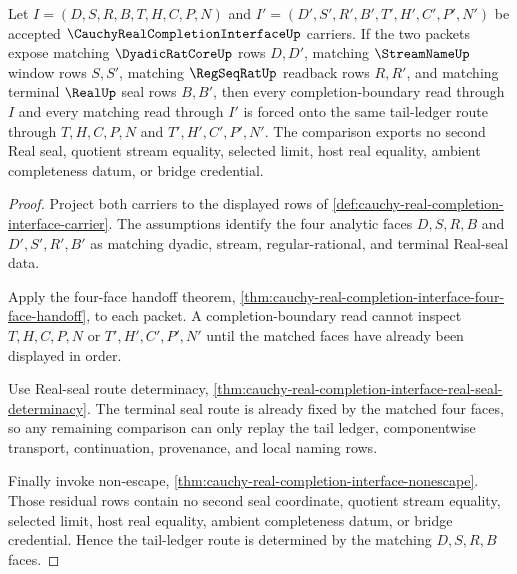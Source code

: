 \begin{theorem}
\label{thm:cauchy-real-completion-interface-tail-ledger-determinacy}
Let $I=(D,S,R,B,T,H,C,P,N)$ and $I'=(D',S',R',B',T',H',C',P',N')$ be accepted $\CauchyRealCompletionInterfaceUp$ carriers. If the two packets expose matching $\DyadicRatCoreUp$ rows $D,D'$, matching $\StreamNameUp$ window rows $S,S'$, matching $\RegSeqRatUp$ readback rows $R,R'$, and matching terminal $\RealUp$ seal rows $B,B'$, then every completion-boundary read through $I$ and every matching read through $I'$ is forced onto the same tail-ledger route through $T,H,C,P,N$ and $T',H',C',P',N'$. The comparison exports no second Real seal, quotient stream equality, selected limit, host real equality, ambient completeness datum, or bridge credential.
\end{theorem}
\begin{proof}
Project both carriers to the displayed rows of \autoref{def:cauchy-real-completion-interface-carrier}. The assumptions identify the four analytic faces $D,S,R,B$ and $D',S',R',B'$ as matching dyadic, stream, regular-rational, and terminal Real-seal data.

Apply the four-face handoff theorem, \autoref{thm:cauchy-real-completion-interface-four-face-handoff}, to each packet. A completion-boundary read cannot inspect $T,H,C,P,N$ or $T',H',C',P',N'$ until the matched faces have already been displayed in order.

Use Real-seal route determinacy, \autoref{thm:cauchy-real-completion-interface-real-seal-determinacy}. The terminal seal route is already fixed by the matched four faces, so any remaining comparison can only replay the tail ledger, componentwise transport, continuation, provenance, and local naming rows.

Finally invoke non-escape, \autoref{thm:cauchy-real-completion-interface-nonescape}. Those residual rows contain no second seal coordinate, quotient stream equality, selected limit, host real equality, ambient completeness datum, or bridge credential. Hence the tail-ledger route is determined by the matching $D,S,R,B$ faces.
\end{proof}


